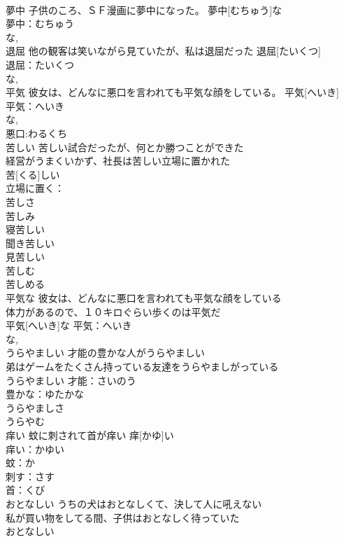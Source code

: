 \documentclass[8pt]{extreport}
\begin{document}
\begin{CJK}{UTF8}{min}
\\	夢中	子供のころ、ＳＦ漫画に夢中になった。	夢中[むちゅう]な	
\\	夢中：むちゅう
\\	な, 
\\	退屈	他の観客は笑いながら見ていたが、私は退屈だった	退屈[たいくつ]	
\\	退屈：たいくつ
\\	な, 
\\	平気	彼女は、どんなに悪口を言われても平気な顔をしている。	平気[へいき]	
\\	平気：へいき
\\	な, 
\\	悪口:わるくち
\\	苦しい	苦しい試合だったが、何とか勝つことができた 
\\	経営がうまくいかず、社長は苦しい立場に置かれた 
\\	苦[くる]しい			
\\	立場に置く：
\\	苦しさ 
\\	苦しみ 
\\	寝苦しい 
\\	聞き苦しい 
\\	見苦しい 
\\	苦しむ 
\\	苦しめる 
\\	平気な	彼女は、どんなに悪口を言われても平気な顔をしている 
\\	体力があるので、１０キロぐらい歩くのは平気だ 
\\	平気[へいき]な			平気：へいき
\\	な, 
\\	うらやましい	才能の豊かな人がうらやましい 
\\	弟はゲームをたくさん持っている友達をうらやましがっている 
\\	うらやましい			才能：さいのう
\\	豊かな：ゆたかな
\\	うらやましさ 
\\	うらやむ 
\\	痒い	蚊に刺されて首が痒い	痒[かゆ]い	
\\	痒い：かゆい
\\	蚊：か
\\	刺す：さす
\\	首：くび
\\	おとなしい	うちの犬はおとなしくて、決して人に吼えない 
\\	私が買い物をしてる間、子供はおとなしく待っていた 
\\	おとなしい			

\end{CJK}
\end{document}

